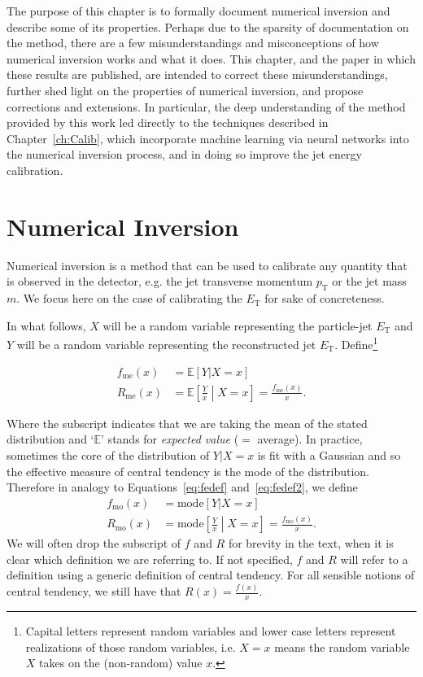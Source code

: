 The purpose of this chapter is to formally document numerical inversion and describe some of its properties. 
Perhaps due to the sparsity of documentation on the method, there are a few misunderstandings and misconceptions of how numerical inversion works and what it does.
This chapter, and the paper in which these results are published, are intended to correct these misunderstandings, further shed light on the properties of numerical inversion, and propose corrections and extensions.
In particular, the deep understanding of the method provided by this work led directly to the techniques described in Chapter~\ref{ch:Calib}, which incorporate machine learning via neural networks into the numerical inversion process, and in doing so improve the jet energy calibration.

\section{Numerical Inversion}
\label{sec:NI:numinversion}
Numerical inversion is a method that can be used to calibrate any quantity that is observed in the detector, e.g. the jet transverse momentum $p_\text{T}$ or the jet mass $m$.
We focus here on the case of calibrating the $E_\text{T}$ for sake of concreteness.

In what follows, $X$ will be a random variable representing the particle-jet $E_\text{T}$ and $Y$ will be a random variable representing the reconstructed jet $E_\text{T}$.
Define\footnote{Capital letters represent random variables and lower case letters represent realizations of those random variables, i.e. $X=x$ means the random variable $X$ takes on the (non-random) value $x$.}

\begin{align}
\label{eq:fedef}
f_\text{me}(x)&=\mathbb{E}[Y|X=x]\\\label{eq:fedef2}
R_\text{me}(x) &= \mathbb{E}\left[\frac{Y}{x}\middle| X=x\right] = \frac{f_\text{me}(x)}{x}. 
\end{align}

Where the subscript indicates that we are taking the mean of the stated distribution and `$\mathbb{E}$' stands for {\it expected value} ($=$ average). In practice, sometimes the core of the distribution of $Y|X=x$ is fit with a Gaussian and so the effective measure of central tendency is the mode of the distribution.  Therefore in analogy to Equations~\ref{eq:fedef} and~\ref{eq:fedef2}, we define
\begin{align}
f_\text{mo}(x)&=\text{mode}[Y|X=x]\\
R_\text{mo}(x) &= \text{mode}\left[\frac{Y}{x}\middle| X=x\right] = \frac{f_\text{mo}(x)}{x}. 
\end{align}
We will often drop the subscript of $f$ and $R$ for brevity in the text, when it is clear which definition we are referring to. If not specified, $f$ and $R$ will refer to a definition using a generic definition of central tendency.  For all sensible notions of central tendency, we still have that $R(x) = \frac{f(x)}{x}$.

